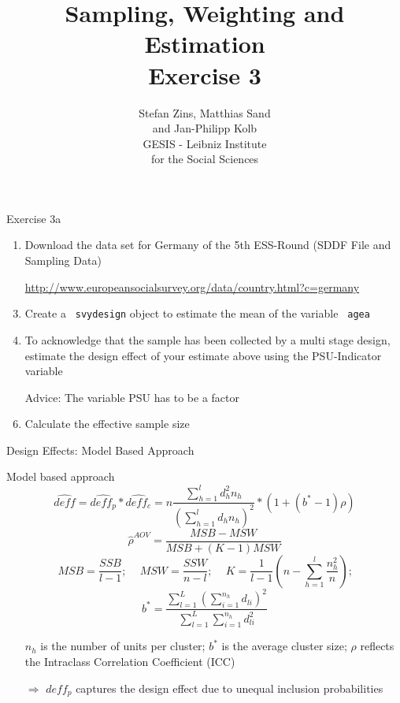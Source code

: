 \documentclass[11pt,german,hideothersubsections]{beamer}\usepackage[]{graphicx}\usepackage[]{color}
\title[Day 3]{Sampling, Weighting and Estimation\\ \Large{Exercise 3} }
\author[M. Sand]{Stefan Zins, Matthias Sand\\ and Jan-Philipp Kolb\\ \vspace{.5cm} \footnotesize{GESIS - Leibniz Institute\\ for the Social Sciences}}
\newcommand{\R}[1]{{\tt \color{blue}  #1}}
\begin{document}
\maketitle



\begin{frame}[fragile]{Exercise 3a}

\begin{enumerate}

\item Download the data set for Germany of the 5th ESS-Round (SDDF File and Sampling Data)
\item[] \url{http://www.europeansocialsurvey.org/data/country.html?c=germany}
\item Create a \R{svydesign} object to estimate the mean of the variable \R{agea}
\item To acknowledge that the sample has been collected by a multi stage design, estimate the design effect of your estimate above using the PSU-Indicator variable 
\item[] \alert{Advice:} The variable \alert{PSU} has to be a factor
\item Calculate the effective sample size
 

\end{enumerate}


\end{frame}
\begin{frame}[fragile]{Design Effects: Model Based Approach}
\footnotesize{
\begin{block}{Model based approach}
\begin{equation*}
\hat{deff}=\hat{deff_p} * \hat{deff_c} = n\frac{\sum_{h=1}^ld_h^2 n_h}{(\sum_{h=1}^ld_h n_h)^2}*(1+(b^{*}-1)\rho)
\end{equation*}
\begin{equation*}
\hat{\rho}^{AOV}=\frac{MSB-MSW}{MSB+(K-1)MSW}
\end{equation*}
\begin{equation*}
MSB=\frac{SSB}{l-1}\text{;~~~~}MSW=\frac{SSW}{n-l}\text{;~~~~}K=\frac{1}{l-1}(n-\sum_{h=1}^l\frac{n_h^2}{n})\text{;}
\end{equation*}
\begin{equation*}
b^{*}=\frac{\sum_{l=1}^{L}(\sum_{i=1}^{n_h}d_{li})^2}{\sum_{l=1}^{L}\sum_{i=1}^{n_h}d_{li}^2}
\end{equation*}
\end{block}

\begin{itemize}
\item[] \alert{$n_h$} is the number of units per cluster; \alert{$b^{*}$} is the average cluster size; \alert{$\rho$} reflects the Intraclass Correlation Coefficient (ICC)
\item[$\Rightarrow$] $deff_p$ captures the design effect due to unequal inclusion probabilities
\end{itemize}
}
\end{frame}
\end{document}
